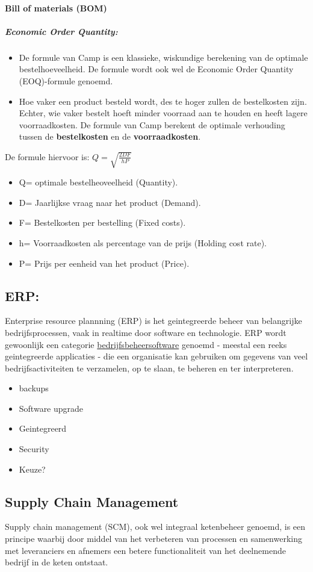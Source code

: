 \documentclass[12pt]{article}
\begin{document}
\paragraph{Bill of materials (BOM)}
\subparagraph{Economic Order Quantity:}
\begin{itemize}
    \item De formule van Camp is een klassieke, wiskundige berekening van de optimale bestelhoeveelheid. De formule wordt ook wel de Economic Order Quantity (EOQ)-formule genoemd.
    \item Hoe vaker een product besteld wordt, des te hoger zullen de bestelkosten zijn. Echter, wie vaker bestelt hoeft minder voorraad aan te houden en heeft lagere voorraadkosten. De formule van Camp  berekent de optimale verhouding tussen de \textbf{bestelkosten} en de \textbf{voorraadkosten}.
\end{itemize}
De formule hiervoor is: $Q=\sqrt{\frac{2DF}{hP}}$\begin{itemize}
    \item Q= optimale bestelheoveelheid (Quantity).
    \item D= Jaarlijkse vraag naar het product (Demand).
    \item F= Bestelkosten per bestelling (Fixed costs).
    \item h= Voorraadkosten als percentage van de prijs (Holding cost rate).
    \item P= Prijs per eenheid van het product (Price).
\end{itemize}
\subsection{ERP:}
Enterprise resource plannning (ERP) is het geintegreerde beheer van belangrijke bedrijfsprocessen, vaak in realtime door software en technologie. ERP wordt gewoonlijk een categorie \underline{bedrijfsbeheersoftware} genoemd - meestal een reeks geintegreerde applicaties - die een organisatie kan gebruiken om gegevens van veel bedrijfsactiviteiten te verzamelen, op te slaan, te beheren en ter interpreteren.
\begin{itemize}
    \item backups
    \item Software upgrade
    \item Geintegreerd
    \item Security
    \item Keuze?
\end{itemize}
\subsection{Supply Chain Management}
Supply chain management (SCM), ook wel integraal ketenbeheer genoemd, is een principe waarbij door middel van het verbeteren van processen en samenwerking met leveranciers en afnemers een betere functionaliteit van het deelnemende bedrijf in de keten ontstaat.
\end{document}
